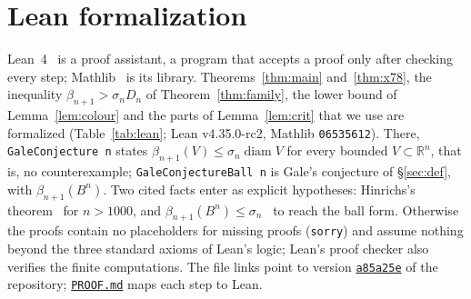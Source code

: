 \documentclass[10pt,a4paper,reqno]{amsart}
\newcommand{\R}{\mathbb R}
\DeclareMathOperator{\diam}{diam}
\newcommand{\repo}{https://github.com/Sager611/riemann/blob/a85a25ee1578748e7fa014f51dd762a6195fe923/}
\newcommand{\file}[2]{\href{\repo #2}{\texttt{#1}}}
\begin{document}
\section{Lean formalization}\label{sec:lean}

Lean~4~\cite{dMU21} is a proof assistant, a program that accepts a proof only after checking every step; Mathlib~\cite{mC20} is its library. Theorems~\ref{thm:main} and~\ref{thm:x78}, the inequality $\beta_{n+1}>\sigma_nD_n$ of Theorem~\ref{thm:family}, the lower bound of Lemma~\ref{lem:colour} and the parts of Lemma~\ref{lem:crit} that we use are formalized (Table~\ref{tab:lean}; Lean v4.35.0-rc2, Mathlib \texttt{06535612}). There, \texttt{GaleConjecture n} states $\beta_{n+1}(V)\le\sigma_n\diam V$ for every bounded $V\subset\R^n$, that is, no counterexample; \texttt{GaleConjectureBall n} is Gale's conjecture of \S\ref{sec:def}, with $\beta_{n+1}(B^n)$. Two cited facts enter as explicit hypotheses: Hinrichs's theorem~\cite{Hi02} for $n>1000$, and $\beta_{n+1}(B^n)\le\sigma_n$~\cite{Vo26} to reach the ball form. Otherwise the proofs contain no placeholders for missing proofs (\texttt{sorry}) and assume nothing beyond the three standard axioms of Lean's logic; Lean's proof checker also verifies the finite computations. The file links point to version \href{https://github.com/Sager611/riemann/tree/a85a25ee1578748e7fa014f51dd762a6195fe923}{\texttt{a85a25e}} of the repository; \file{PROOF.md}{papers/02_gale-fails-every-dimension/PROOF.md} maps each step to Lean.
\end{document}
